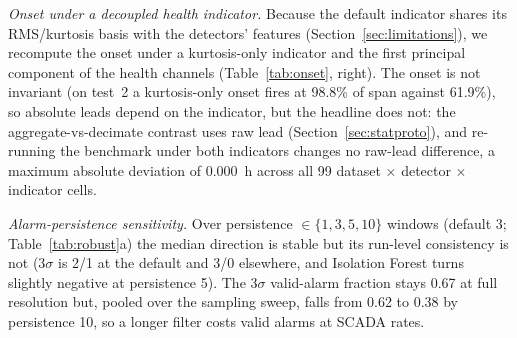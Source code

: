 \documentclass[IJPHM, 2026, 0]{PHMSociety}
\begin{document}
\emph{Onset under a decoupled health indicator.} Because the default indicator shares its RMS/kurtosis basis with the detectors' features (Section~\ref{sec:limitations}), we recompute the onset under a kurtosis-only indicator and the first principal component of the health channels (Table~\ref{tab:onset}, right). The onset is not invariant (on test~2 a kurtosis-only onset fires at 98.8\% of span against 61.9\%), so absolute leads depend on the indicator, but the headline does not: the aggregate-vs-decimate contrast uses raw lead (Section~\ref{sec:statproto}), and re-running the benchmark under both indicators changes no raw-lead difference, a maximum absolute deviation of 0.000~h across all 99 dataset $\times$ detector $\times$ indicator cells.

\emph{Alarm-persistence sensitivity.} Over persistence $\in \{1,3,5,10\}$ windows (default 3; Table~\ref{tab:robust}a) the median direction is stable but its run-level consistency is not ($3\sigma$ is 2/1 at the default and 3/0 elsewhere, and Isolation Forest turns slightly negative at persistence 5). The $3\sigma$ valid-alarm fraction stays 0.67 at full resolution but, pooled over the sampling sweep, falls from 0.62 to 0.38 by persistence 10, so a longer filter costs valid alarms at SCADA rates.
\end{document}
